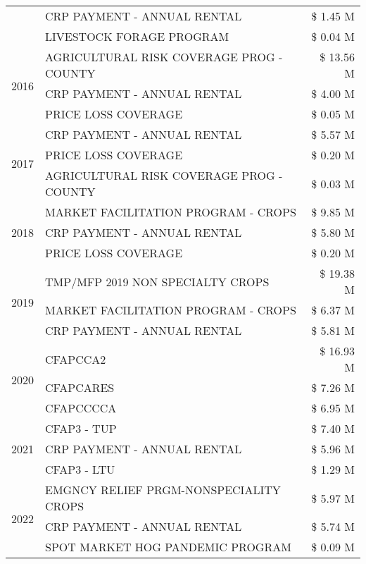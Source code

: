 \begin{tabular}{llr}
 & CRP PAYMENT - ANNUAL RENTAL & \$ 1.45 M \\
 & LIVESTOCK FORAGE PROGRAM & \$ 0.04 M \\
\cline{1-3}
\multirow[t]{3}{*}{2016} & AGRICULTURAL RISK COVERAGE PROG - COUNTY & \$ 13.56 M \\
 & CRP PAYMENT - ANNUAL RENTAL & \$ 4.00 M \\
 & PRICE LOSS COVERAGE & \$ 0.05 M \\
\cline{1-3}
\multirow[t]{3}{*}{2017} & CRP PAYMENT - ANNUAL RENTAL & \$ 5.57 M \\
 & PRICE LOSS COVERAGE & \$ 0.20 M \\
 & AGRICULTURAL RISK COVERAGE PROG - COUNTY & \$ 0.03 M \\
\cline{1-3}
\multirow[t]{3}{*}{2018} & MARKET FACILITATION PROGRAM - CROPS & \$ 9.85 M \\
 & CRP PAYMENT - ANNUAL RENTAL & \$ 5.80 M \\
 & PRICE LOSS COVERAGE & \$ 0.20 M \\
\cline{1-3}
\multirow[t]{3}{*}{2019} & TMP/MFP 2019 NON SPECIALTY CROPS & \$ 19.38 M \\
 & MARKET FACILITATION PROGRAM - CROPS & \$ 6.37 M \\
 & CRP PAYMENT - ANNUAL RENTAL & \$ 5.81 M \\
\cline{1-3}
\multirow[t]{3}{*}{2020} & CFAPCCA2 & \$ 16.93 M \\
 & CFAPCARES & \$ 7.26 M \\
 & CFAPCCCCA & \$ 6.95 M \\
\cline{1-3}
\multirow[t]{3}{*}{2021} & CFAP3 - TUP & \$ 7.40 M \\
 & CRP PAYMENT - ANNUAL RENTAL & \$ 5.96 M \\
 & CFAP3 - LTU & \$ 1.29 M \\
\cline{1-3}
\multirow[t]{3}{*}{2022} & EMGNCY RELIEF PRGM-NONSPECIALITY CROPS & \$ 5.97 M \\
 & CRP PAYMENT - ANNUAL RENTAL & \$ 5.74 M \\
 & SPOT MARKET HOG PANDEMIC PROGRAM & \$ 0.09 M \\
\cline{1-3}
\bottomrule
\end{tabular}
